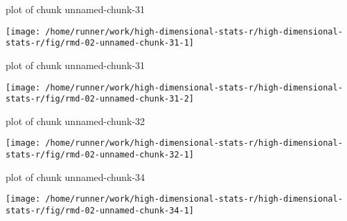 \documentclass[ignorenonframetext,]{beamer}
\begin{document}
\begin{frame}{plot of chunk unnamed-chunk-31}
\protect\hypertarget{plot-of-chunk-unnamed-chunk-31}{}

\texttt{[image: /home/runner/work/high-dimensional-stats-r/high-dimensional-stats-r/fig/rmd-02-unnamed-chunk-31-1]}



\end{frame}

\begin{frame}{plot of chunk unnamed-chunk-31}
\protect\hypertarget{plot-of-chunk-unnamed-chunk-31-1}{}

\texttt{[image: /home/runner/work/high-dimensional-stats-r/high-dimensional-stats-r/fig/rmd-02-unnamed-chunk-31-2]}



\end{frame}

\begin{frame}{plot of chunk unnamed-chunk-32}
\protect\hypertarget{plot-of-chunk-unnamed-chunk-32}{}

\texttt{[image: /home/runner/work/high-dimensional-stats-r/high-dimensional-stats-r/fig/rmd-02-unnamed-chunk-32-1]}



\end{frame}

\begin{frame}{plot of chunk unnamed-chunk-34}
\protect\hypertarget{plot-of-chunk-unnamed-chunk-34}{}

\texttt{[image: /home/runner/work/high-dimensional-stats-r/high-dimensional-stats-r/fig/rmd-02-unnamed-chunk-34-1]}



\end{frame}
\end{document}
